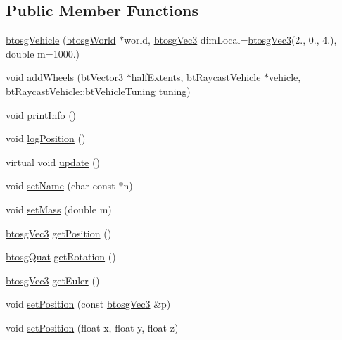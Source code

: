 \subsection*{Public Member Functions}
\begin{DoxyCompactItemize}
\item 
\mbox{\hyperlink{classbtosgVehicle_aa754dd94553b8690763e4c24d1f26227}{btosg\+Vehicle}} (\mbox{\hyperlink{classbtosgWorld}{btosg\+World}} $\ast$world, \mbox{\hyperlink{classbtosgVec3}{btosg\+Vec3}} dim\+Local=\mbox{\hyperlink{classbtosgVec3}{btosg\+Vec3}}(2., 0., 4.), double m=1000.)
\item 
void \mbox{\hyperlink{classbtosgVehicle_a98971fb952c08cb72341a0c333fc66de}{add\+Wheels}} (bt\+Vector3 $\ast$half\+Extents, bt\+Raycast\+Vehicle $\ast$\mbox{\hyperlink{classbtosgVehicle_ac45b117f8b523f7040de99639deb7522}{vehicle}}, bt\+Raycast\+Vehicle\+::bt\+Vehicle\+Tuning tuning)
\item 
void \mbox{\hyperlink{classbtosgVehicle_abe98f64f0a8f37c7c0b244e3afbbcb15}{print\+Info}} ()
\item 
void \mbox{\hyperlink{classbtosgVehicle_ae9168c62263b26f95d068d94d6a7cab7}{log\+Position}} ()
\item 
virtual void \mbox{\hyperlink{classbtosgVehicle_a5fd0f471df492ac232c9b772a28bd2b9}{update}} ()
\item 
void \mbox{\hyperlink{classbtosgObject_ab06a1b3f357209214c6440cd5746523e}{set\+Name}} (char const $\ast$n)
\item 
void \mbox{\hyperlink{classbtosgObject_a91da93c82d48b86192f0cbb16054fe57}{set\+Mass}} (double m)
\item 
\mbox{\hyperlink{classbtosgVec3}{btosg\+Vec3}} \mbox{\hyperlink{classbtosgObject_a3dadd5da8f2a312e44a039446b93d4cd}{get\+Position}} ()
\item 
\mbox{\hyperlink{classbtosgQuat}{btosg\+Quat}} \mbox{\hyperlink{classbtosgObject_a3b825999ad3a51bde743d4085ff19dae}{get\+Rotation}} ()
\item 
\mbox{\hyperlink{classbtosgVec3}{btosg\+Vec3}} \mbox{\hyperlink{classbtosgObject_a2019ec63bde02b72600450c7c985e77a}{get\+Euler}} ()
\item 
void \mbox{\hyperlink{classbtosgObject_ace6b51040b7ddce90818174200cc6074}{set\+Position}} (const \mbox{\hyperlink{classbtosgVec3}{btosg\+Vec3}} \&p)
\item 
void \mbox{\hyperlink{classbtosgObject_adb9f2cff0faf66dc252cd7c97b11ac84}{set\+Position}} (float x, float y, float z)
\item 

\end{DoxyCompactItemize}

